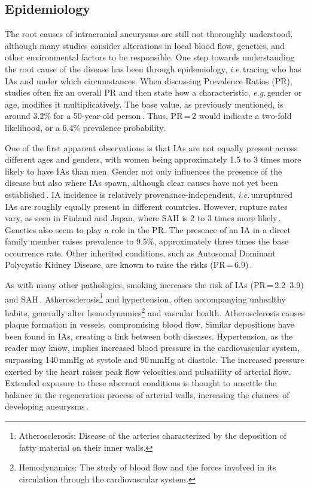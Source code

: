 \subsection{Epidemiology}
The root causes of intracranial aneurysms are still not thoroughly understood, although many studies consider alterations in local blood flow, genetics, and other environmental factors to be responsible. One step towards understanding the root cause of the disease has been through epidemiology, \textit{i.e.}\,tracing who has IAs and under which circumstances. When discussing Prevalence Ratios (PR), studies often fix an overall PR and then state how a characteristic, \textit{e.g.}\,gender or age, modifies it multiplicatively. The base value, as previously mentioned, is around 3.2\% for a 50-year-old person\,\cite{Vlak2011}. Thus, PR\,=\,2 would indicate a two-fold likelihood, or a 6.4\% prevalence probability.

One of the first apparent observations is that IAs are not equally present across different ages and genders, with women being approximately 1.5 to 3 times more likely to have IAs than men. Gender not only influences the presence of the disease but also where IAs spawn, although clear causes have not yet been established\,\cite{Rinkel1998, Brown2014}. IA incidence is relatively provenance-independent, \textit{i.e.}\,unruptured IAs are roughly equally present in different countries. However, rupture rates vary, as seen in Finland and Japan, where SAH is 2 to 3 times more likely\,\cite{Etminan2019}. Genetics also seem to play a role in the PR\@. The presence of an IA in a direct family member raises prevalence to 9.5\%, approximately three times the base occurrence rate. Other inherited conditions, such as Autosomal Dominant Polycystic Kidney Disease, are known to raise the risks (PR\,=\,6.9)\,\cite{Vlak2011}.

As with many other pathologies, smoking increases the risk of IAs (PR\,=\,2.2--3.9) and SAH\,\cite{Etminan2016, Ji2016, Thompson2015}. Atherosclerosis\footnote{Atherosclerosis: Disease of the arteries characterized by the deposition of fatty material on their inner walls.} and hypertension, often accompanying unhealthy habits, generally alter hemodynamics\footnote{Hemodynamics: The study of blood flow and the forces involved in its circulation through the cardiovascular system.} and vascular health. Atherosclerosis causes plaque formation in vessels, compromising blood flow. Similar depositions have been found in IAs, creating a link between both diseases. Hypertension, as the reader may know, implies increased blood pressure in the cardiovascular system, surpassing 140\,mmHg at systole and 90\,mmHg at diastole. The increased pressure exerted by the heart raises peak flow velocities and pulsatility of arterial flow. Extended exposure to these aberrant conditions is thought to unsettle the balance in the regeneration process of arterial walls, increasing the chances of developing aneurysms\,\cite{Rinkel1998, Etminan2016,Etminan2019}.

